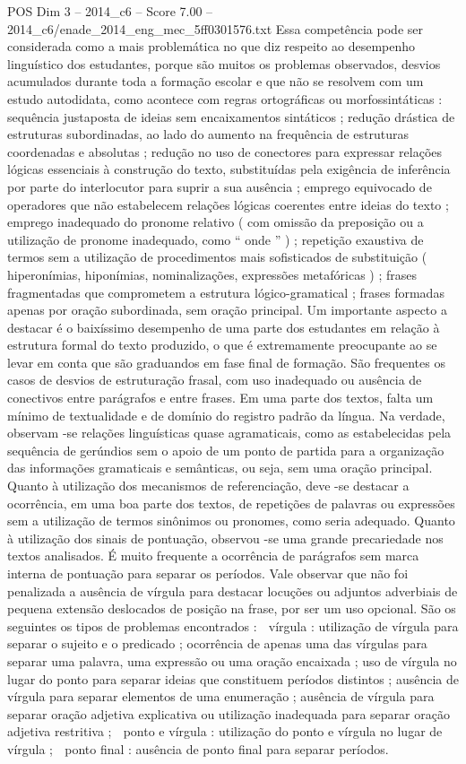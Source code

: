 \begin{textsample}{POS Dim 3 – 2014\_c6 – Score 7.00 – 2014\_c6/enade\_2014\_eng\_mec\_5ff0301576.txt}
Essa competência pode ser considerada como a mais problemática no que diz respeito ao desempenho linguístico dos estudantes, porque são muitos os problemas observados, desvios acumulados durante toda a formação escolar e que não se resolvem com um estudo autodidata, como acontece com regras ortográficas ou morfossintáticas : sequência justaposta de ideias sem encaixamentos sintáticos ; redução drástica de estruturas subordinadas, ao lado do aumento na frequência de estruturas coordenadas e absolutas ; redução no uso de conectores para expressar relações lógicas essenciais à construção do texto, substituídas pela exigência de inferência por parte do interlocutor para suprir a sua ausência ; emprego equivocado de operadores que não estabelecem relações lógicas coerentes entre ideias do texto ; emprego inadequado do pronome relativo ( com omissão da preposição ou a utilização de pronome inadequado, como “ onde ” ) ; repetição exaustiva de termos sem a utilização de procedimentos mais sofisticados de substituição ( hiperonímias, hiponímias, nominalizações, expressões metafóricas ) ; frases fragmentadas que comprometem a estrutura lógico-gramatical ; frases formadas apenas por oração subordinada, sem oração principal.
Um importante aspecto a destacar é o baixíssimo desempenho de uma parte dos estudantes em relação à estrutura formal do texto produzido, o que é extremamente preocupante ao se levar em conta que são graduandos em fase final de formação.
São frequentes os casos de desvios de estruturação frasal, com uso inadequado ou ausência de conectivos entre parágrafos e entre frases.
Em uma parte dos textos, falta um mínimo de textualidade e de domínio do registro padrão da língua.
Na verdade, observam -se relações linguísticas quase agramaticais, como as estabelecidas pela sequência de gerúndios sem o apoio de um ponto de partida para a organização das informações gramaticais e semânticas, ou seja, sem uma oração principal.
Quanto à utilização dos mecanismos de referenciação, deve -se destacar a ocorrência, em uma boa parte dos textos, de repetições de palavras ou expressões sem a utilização de termos sinônimos ou pronomes, como seria adequado.
Quanto à utilização dos sinais de pontuação, observou -se uma grande precariedade nos textos analisados.
É muito frequente a ocorrência de parágrafos sem marca interna de pontuação para separar os períodos.
Vale observar que não foi penalizada a ausência de vírgula para destacar locuções ou adjuntos adverbiais de pequena extensão deslocados de posição na frase, por ser um uso opcional.
São os seguintes os tipos de problemas encontrados :  vírgula : utilização de vírgula para separar o sujeito e o predicado ; ocorrência de apenas uma das vírgulas para separar uma palavra, uma expressão ou uma oração encaixada ; uso de vírgula no lugar do ponto para separar ideias que constituem períodos distintos ; ausência de vírgula para separar elementos de uma enumeração ; ausência de vírgula para separar oração adjetiva explicativa ou utilização inadequada para separar oração adjetiva restritiva ;  ponto e vírgula : utilização do ponto e vírgula no lugar de vírgula ;  ponto final : ausência de ponto final para separar períodos.

\end{textsample}

